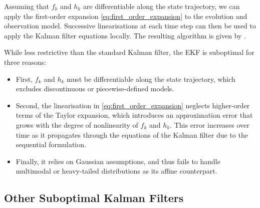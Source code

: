 Assuming that $f_k$ and $h_k$ are differentiable along the state trajectory, we can apply the first-order expansion \eqref{eq:first_order_expansion} to the evolution and observation model. Successive linearisations at each time step can then be used to apply the Kalman filter equations locally. The resulting algorithm is given by .

\begin{algorithm}[ht]
	\begin{algorithmic}
	\State{}
	\State{}
	\end{algorithmic}\caption{Extended Kalman Filter}\label{alg:EKF}
\end{algorithm}

While less restrictive than the standard Kalman filter, the EKF is suboptimal for three reasons:
\begin{itemize}
	\item First, $f_k$ and $h_k$ must be differentiable along the state trajectory, which excludes discontinuous or piecewise-defined models.
	\item Second, the linearisation in \eqref{eq:first_order_expansion} neglects higher-order terms of the Taylor expansion, which introduces an approximation error that grows with the degree of nonlinearity of $f_k$ and $h_k$. This error increases over time as it propagates through the equations of the Kalman filter due to the sequential formulation.
	\item Finally, it relies on Gaussian assumptions, and thus fails to handle multimodal or heavy-tailed distributions as its affine counterpart.
\end{itemize}

\subsection{Other Suboptimal Kalman Filters}

